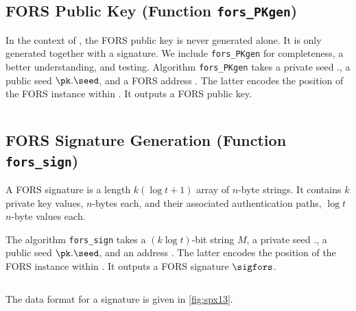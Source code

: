 \begin{algorithm}
    \inputminted[breaklines,linenos,tabsize=2,mathescape,escapeinside=||]{C}{code/fors_treehash.cs}
    \caption{The \texttt{fors\_treehash algorithm.}}
    \label{alg:forstreehash}
\end{algorithm}

\subsection{FORS Public Key (Function \texttt{fors\_PKgen})}

In the context of \SPHINCSA, the FORS public key is never generated alone. It is only generated together with a signature. We include \texttt{fors\_PKgen} for completeness, a better understanding, and testing. Algorithm \texttt{fors\_PKgen} takes a private seed \sk.\seed, a public seed $\pk.\seed$, and a FORS address \ADRS. The latter encodes the position of the FORS instance within \SPHINCSA. It outputs a FORS public key.

\begin{algorithm}
    \inputminted[breaklines,linenos,tabsize=2,mathescape,escapeinside=||]{C}{code/fors_PKgen.cs}
    \caption{\texttt{ fors\_PKgen } --- Generate a FORS public key. }
    \label{alg:forspkgen}
\end{algorithm}


\subsection{FORS Signature Generation (Function \texttt{fors\_sign})}

A FORS signature is a length $k(\log t+1)$ array of $n$-byte strings. It contains $k$ private key values, $n$-bytes each, and their associated authentication paths, $\log t$ $n$-byte values each.

The algorithm \texttt{fors\_sign} takes a $(k\log t)$-bit string $M$, a private seed \sk.\seed, a public seed $\pk.\seed$, and an address \ADRS. The latter encodes the position of the FORS instance within \SPHINCSA. It outputs a FORS signature $\sigfors$.

\begin{algorithm}
    \inputminted[breaklines,linenos,tabsize=2,mathescape,escapeinside=||]{C}{code/fors_sign.cs}
    \caption{\texttt{ fors\_sign } --- Generate a FORS signature on string $M$. }
    \label{alg:forssign}
\end{algorithm}

The data format for a signature is given in \cref{fig:spx13}.

